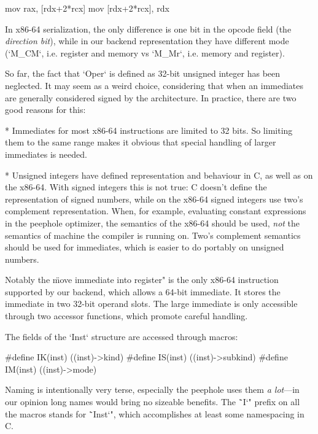 \begtt
mov rax, [rdx+2*rcx]
mov [rdx+2*rcx], rdx
\endtt

In x86-64 serialization, the only difference is one bit in the opcode field
(the {\em direction bit}), while in our backend representation they have different
mode (`M_CM`, i.e. register and memory vs `M_Mr`, i.e. memory and register).

So far, the fact that `Oper` is defined as 32-bit unsigned integer has been
neglected. It may seem as a weird choice, considering that when an immediates
are generally considered signed by the architecture. In practice, there are two
good reasons for this:



\begitems
* Immediates for most x86-64 instructions are limited to 32 bits. So limiting
them to the same range makes it obvious that special handling of larger
immediates is needed.

* Unsigned integers have defined representation and behaviour in C, as well as
on the x86-64. With signed integers this is not true: C doesn't define the
representation of signed numbers, while on the x86-64 signed integers use {two's complement}
representation. When, for example, evaluating constant expressions in the peephole
optimizer, the semantics of the x86-64 should be used, {\em not} the semantics
of machine the compiler is running on. Two's complement semantics should be used
for immediates, which is easier to do portably on unsigned numbers.
\enditems

Notably the \"move immediate into register" is the only x86-64 instruction
supported by our backend, which allows a 64-bit immediate. It stores the immediate
in two 32-bit operand slots. The large immediate is only accessible through two
accessor functions, which promote careful handling.

The fields of the `Inst` structure are accessed through macros:

\begtt
#define IK(inst) ((inst)->kind)
#define IS(inst) ((inst)->subkind)
#define IM(inst) ((inst)->mode)
\endtt

Naming is intentionally very terse, especially the peephole uses them {\em a
lot}---in our opinion long names would bring no sizeable benefits. The \"`I`"
prefix on all the macros stands for \"`Inst`", which accomplishes at least some
namespacing in C.

